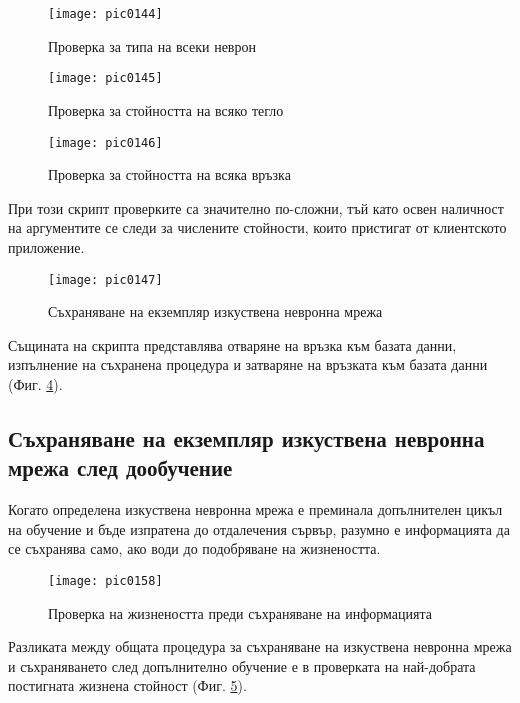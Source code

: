 \begin{figure}[h]
  \centering
  \texttt{[image: pic0144]}
  \caption{Проверка за типа на всеки неврон}
\label{fig:pic0144}
\end{figure}
\FloatBarrier

\begin{figure}[h]
  \centering
  \texttt{[image: pic0145]}
  \caption{Проверка за стойността на всяко тегло}
\label{fig:pic0145}
\end{figure}
\FloatBarrier

\begin{figure}[h]
  \centering
  \texttt{[image: pic0146]}
  \caption{Проверка за стойността на всяка връзка}
\label{fig:pic0146}
\end{figure}
\FloatBarrier

При този скрипт проверките са значително по-сложни, тъй като освен наличност на аргументите се следи за числените стойности, които пристигат от клиентското приложение. 

\begin{figure}[h]
  \centering
  \texttt{[image: pic0147]}
  \caption{Съхраняване на екземпляр изкуствена невронна мрежа}
\label{fig:pic0147}
\end{figure}
\FloatBarrier

Същината на скрипта представлява отваряне на връзка към базата данни, изпълнение на съхранена процедура и затваряне на връзката към базата данни (Фиг. \ref{fig:pic0147}).

\subsection{Съхраняване на екземпляр изкуствена невронна мрежа след дообучение}

Когато определена изкуствена невронна мрежа е преминала допълнителен цикъл на обучение и бъде изпратена до отдалечения сървър, разумно е информацията да се съхранява само, ако води до подобряване на жизнеността. 

\begin{figure}[h]
  \centering
  \texttt{[image: pic0158]}
  \caption{Проверка на жизнеността преди съхраняване на информацията}
\label{fig:pic0158}
\end{figure}
\FloatBarrier

Разликата между общата процедура за съхраняване на изкуствена невронна мрежа и съхраняването след допълнително обучение е в проверката на най-добрата постигната жизнена стойност (Фиг. \ref{fig:pic0158}).

